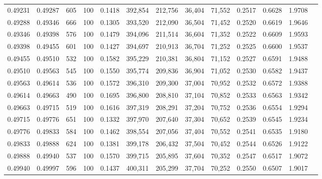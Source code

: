 \begin{tabular}{rrrrrrrrrrrrr}
0.49231 & 0.49287 &   605 & 100 &                                     0.1418 & 392,854 & 212,756 &  36,404 &  71,552 & 0.2517 & 0.6628 & 1.9708 \\
0.49288 & 0.49346 &   666 & 100 &                                     0.1305 & 393,520 & 212,090 &  36,504 &  71,452 & 0.2520 & 0.6619 & 1.9646 \\
0.49346 & 0.49398 &   576 & 100 &                                     0.1479 & 394,096 & 211,514 &  36,604 &  71,352 & 0.2522 & 0.6609 & 1.9593 \\
0.49398 & 0.49455 &   601 & 100 &                                     0.1427 & 394,697 & 210,913 &  36,704 &  71,252 & 0.2525 & 0.6600 & 1.9537 \\
0.49455 & 0.49510 &   532 & 100 &                                     0.1582 & 395,229 & 210,381 &  36,804 &  71,152 & 0.2527 & 0.6591 & 1.9488 \\
0.49510 & 0.49563 &   545 & 100 &                                     0.1550 & 395,774 & 209,836 &  36,904 &  71,052 & 0.2530 & 0.6582 & 1.9437 \\
0.49563 & 0.49614 &   536 & 100 &                                     0.1572 & 396,310 & 209,300 &  37,004 &  70,952 & 0.2532 & 0.6572 & 1.9388 \\
0.49614 & 0.49663 &   490 & 100 &                                     0.1695 & 396,800 & 208,810 &  37,104 &  70,852 & 0.2533 & 0.6563 & 1.9342 \\
0.49663 & 0.49715 &   519 & 100 &                                     0.1616 & 397,319 & 208,291 &  37,204 &  70,752 & 0.2536 & 0.6554 & 1.9294 \\
0.49715 & 0.49776 &   651 & 100 &                                     0.1332 & 397,970 & 207,640 &  37,304 &  70,652 & 0.2539 & 0.6545 & 1.9234 \\
0.49776 & 0.49833 &   584 & 100 &                                     0.1462 & 398,554 & 207,056 &  37,404 &  70,552 & 0.2541 & 0.6535 & 1.9180 \\
0.49833 & 0.49888 &   624 & 100 &                                     0.1381 & 399,178 & 206,432 &  37,504 &  70,452 & 0.2544 & 0.6526 & 1.9122 \\
0.49888 & 0.49940 &   537 & 100 &                                     0.1570 & 399,715 & 205,895 &  37,604 &  70,352 & 0.2547 & 0.6517 & 1.9072 \\
0.49940 & 0.49997 &   596 & 100 &                                     0.1437 & 400,311 & 205,299 &  37,704 &  70,252 & 0.2550 & 0.6507 & 1.9017 \\

\end{tabular}
